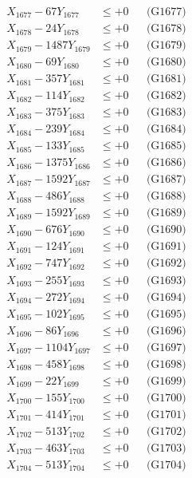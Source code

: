 \documentclass[a4paper,10pt]{article}
\begin{document}
{\begin{align}
X_{1677} - 67Y_{1677} &\leq +0 && \text{(G1677)} \\
X_{1678} - 24Y_{1678} &\leq +0 && \text{(G1678)} \\
X_{1679} - 1487Y_{1679} &\leq +0 && \text{(G1679)} \\
X_{1680} - 69Y_{1680} &\leq +0 && \text{(G1680)} \\
\allowbreak
X_{1681} - 357Y_{1681} &\leq +0 && \text{(G1681)} \\
X_{1682} - 114Y_{1682} &\leq +0 && \text{(G1682)} \\
X_{1683} - 375Y_{1683} &\leq +0 && \text{(G1683)} \\
X_{1684} - 239Y_{1684} &\leq +0 && \text{(G1684)} \\
X_{1685} - 133Y_{1685} &\leq +0 && \text{(G1685)} \\
X_{1686} - 1375Y_{1686} &\leq +0 && \text{(G1686)} \\
X_{1687} - 1592Y_{1687} &\leq +0 && \text{(G1687)} \\
X_{1688} - 486Y_{1688} &\leq +0 && \text{(G1688)} \\
X_{1689} - 1592Y_{1689} &\leq +0 && \text{(G1689)} \\
X_{1690} - 676Y_{1690} &\leq +0 && \text{(G1690)} \\
\allowbreak
X_{1691} - 124Y_{1691} &\leq +0 && \text{(G1691)} \\
X_{1692} - 747Y_{1692} &\leq +0 && \text{(G1692)} \\
X_{1693} - 255Y_{1693} &\leq +0 && \text{(G1693)} \\
X_{1694} - 272Y_{1694} &\leq +0 && \text{(G1694)} \\
X_{1695} - 102Y_{1695} &\leq +0 && \text{(G1695)} \\
X_{1696} - 86Y_{1696} &\leq +0 && \text{(G1696)} \\
X_{1697} - 1104Y_{1697} &\leq +0 && \text{(G1697)} \\
X_{1698} - 458Y_{1698} &\leq +0 && \text{(G1698)} \\
X_{1699} - 22Y_{1699} &\leq +0 && \text{(G1699)} \\
X_{1700} - 155Y_{1700} &\leq +0 && \text{(G1700)} \\
\allowbreak
X_{1701} - 414Y_{1701} &\leq +0 && \text{(G1701)} \\
X_{1702} - 513Y_{1702} &\leq +0 && \text{(G1702)} \\
X_{1703} - 463Y_{1703} &\leq +0 && \text{(G1703)} \\
X_{1704} - 513Y_{1704} &\leq +0 && \text{(G1704)} \\

\end{align}}
\end{document}
